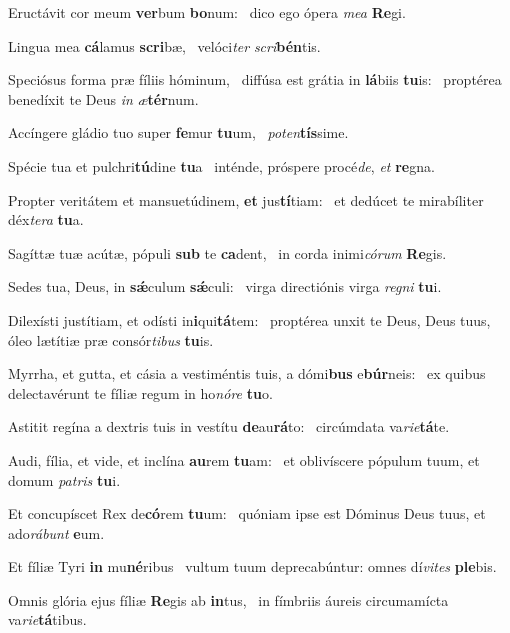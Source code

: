 \item Eructávit cor meum \textbf{ver}bum \textbf{bo}num:~\psstar{} dico ego ópera \textit{mea} \textbf{Re}gi.
\item Lingua mea \textbf{cá}lamus \textbf{scri}bæ,~\psstar{} velóci\textit{ter} \textit{scri}\textbf{bén}tis.
\item Speciósus forma præ fíliis hóminum,~\pscross{} diffúsa est grátia in \textbf{lá}biis \textbf{tu}is:~\psstar{} proptérea benedíxit te Deus \textit{in} \textit{æ}\textbf{tér}num.
\item Accíngere gládio tuo super \textbf{fe}mur \textbf{tu}um,~\psstar{} \textit{poten}\textbf{tís}sime.
\item Spécie tua et pulchri\textbf{tú}dine \textbf{tu}a~\psstar{} inténde, próspere procé\textit{de}, \textit{et} \textbf{re}gna.
\item Propter veritátem et mansuetúdinem, \textbf{et} jus\textbf{tí}tiam:~\psstar{} et dedúcet te mirabíliter déx\textit{tera} \textbf{tu}a.
\item Sagíttæ tuæ acútæ, pópuli \textbf{sub} te \textbf{ca}dent,~\psstar{} in corda inimi\textit{córum} \textbf{Re}gis.
\item Sedes tua, Deus, in \textbf{sǽ}culum \textbf{sǽ}culi:~\psstar{} virga directiónis virga \textit{regni} \textbf{tu}i.
\item Dilexísti justítiam, et odísti in\textbf{i}qui\textbf{tá}tem:~\psstar{} proptérea unxit te Deus, Deus tuus, óleo lætítiæ præ consór\textit{tibus} \textbf{tu}is.
\item Myrrha, et gutta, et cásia a vestiméntis tuis, a dómi\textbf{bus} e\textbf{búr}neis:~\psstar{} ex quibus delectavérunt te fíliæ regum in ho\textit{nóre} \textbf{tu}o.
\item Astitit regína a dextris tuis in vestítu \textbf{de}au\textbf{rá}to:~\psstar{} circúmdata va\textit{rie}\textbf{tá}te.
\item Audi, fília, et vide, et inclína \textbf{au}rem \textbf{tu}am:~\psstar{} et oblivíscere pópulum tuum, et domum \textit{patris} \textbf{tu}i.
\item Et concupíscet Rex de\textbf{có}rem \textbf{tu}um:~\psstar{} quóniam ipse est Dóminus Deus tuus, et ado\textit{rábunt} \textbf{e}um.
\item Et fíliæ Tyri \textbf{in} mu\textbf{né}ribus~\psstar{} vultum tuum deprecabúntur: omnes dí\textit{vites} \textbf{ple}bis.
\item Omnis glória ejus fíliæ \textbf{Re}gis ab \textbf{in}tus,~\psstar{} in fímbriis áureis circumamícta va\textit{rie}\textbf{tá}tibus.
